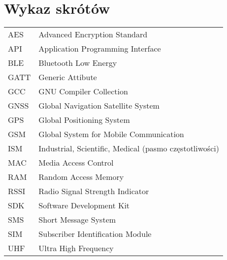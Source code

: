 \chapter*{Wykaz skrótów}

\begin{tabular}{l l}
AES & Advanced Encryption Standard \\
API & Application Programming Interface \\
BLE & Bluetooth Low Energy \\
GATT & Generic Attibute \\
GCC & GNU Compiler Collection \\
GNSS & Global Navigation Satellite System \\
GPS & Global Positioning System \\
GSM & Global System for Mobile Communication \\
ISM & Industrial, Scientific, Medical (pasmo częstotliwości) \\
MAC & Media Access Control \\
RAM & Random Access Memory \\
RSSI & Radio Signal Strength Indicator \\
SDK & Software Development Kit \\
SMS & Short Message System \\
SIM & Subscriber Identification Module \\
UHF & Ultra High Frequency \\




\end{tabular}
